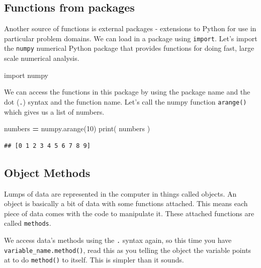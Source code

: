 \documentclass[]{book}
\newenvironment{Shaded}{\begin{snugshade}}{\end{snugshade}}
\newcommand{\BuiltInTok}[1]{#1}
\newcommand{\DecValTok}[1]{\textcolor[rgb]{0.00,0.00,0.81}{#1}}
\newcommand{\ImportTok}[1]{#1}
\newcommand{\NormalTok}[1]{#1}
\newcommand{\OperatorTok}[1]{\textcolor[rgb]{0.81,0.36,0.00}{\textbf{#1}}}
\theoremstyle{definition}
\theoremstyle{definition}
\theoremstyle{definition}
\theoremstyle{remark}
\begin{document}
\hypertarget{functions-from-packages}{%
\subsection{Functions from packages}\label{functions-from-packages}}

Another source of functions is external packages - extensions to Python
for use in particular problem domains. We can load in a package using
\texttt{import}. Let's import the \texttt{numpy} numerical Python
package that provides functions for doing fast, large scale numerical
analysis.

\begin{Shaded}
\begin{Highlighting}[]
\ImportTok{import}\NormalTok{ numpy}
\end{Highlighting}
\end{Shaded}

We can access the functions in this package by using the package name
and the dot (\texttt{.}) syntax and the function name. Let's call the
numpy function \texttt{arange()} which gives us a list of numbers.

\begin{Shaded}
\begin{Highlighting}[]
\NormalTok{numbers }\OperatorTok{=}\NormalTok{ numpy.arange(}\DecValTok{10}\NormalTok{)}
\BuiltInTok{print}\NormalTok{( numbers )}
\end{Highlighting}
\end{Shaded}

\begin{verbatim}
## [0 1 2 3 4 5 6 7 8 9]
\end{verbatim}

\hypertarget{object-methods}{%
\subsection{Object Methods}\label{object-methods}}

Lumps of data are represented in the computer in things called objects.
An object is basically a bit of data with some functions attached. This
means each piece of data comes with the code to manipulate it. These
attached functions are called \texttt{methods}.

We access data's methods using the \texttt{.} syntax again, so this time
you have \texttt{variable\_name.method()}, read this as you telling the
object the variable points at to do \texttt{method()} to itself. This is
simpler than it sounds.
\end{document}
